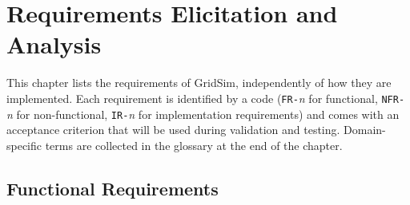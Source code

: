 \documentclass{scrreprt}
\begin{document}
\chapter{Requirements Elicitation and Analysis}\label{requirements}

  This chapter lists the requirements of GridSim, independently of how they
  are
  implemented. Each requirement is identified by a code
  (\texttt{FR-}\textit{n}
  for functional, \texttt{NFR-}\textit{n} for non-functional,
  \texttt{IR-}\textit{n}
  for implementation requirements) and comes with an acceptance criterion
  that
  will be used during validation and testing. Domain-specific terms are
  collected in the glossary at the end of the chapter.

  \section{Functional Requirements}
  \label{sec:functional-requirements}
\end{document}
